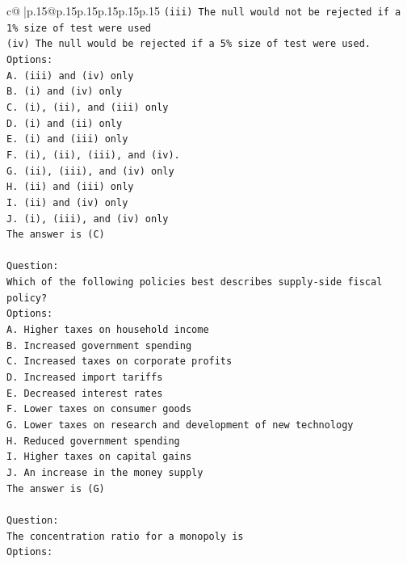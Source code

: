 \documentclass{article}
\begin{document}
{\begin{supertabular}{c@{$\;$}|p{.15\linewidth}@{}p{.15\linewidth}p{.15\linewidth}p{.15\linewidth}p{.15\linewidth}p{.15\linewidth}}
{{{\texttt{(iii) The null would not be rejected if a 1\% size of test were used} \\
\texttt{(iv) The null would be rejected if a 5\% size of test were used.} \\
\texttt{Options:} \\
\texttt{A. (iii) and (iv) only} \\
\texttt{B. (i) and (iv) only} \\
\texttt{C. (i), (ii), and (iii) only} \\
\texttt{D. (i) and (ii) only} \\
\texttt{E. (i) and (iii) only} \\
\texttt{F. (i), (ii), (iii), and (iv).} \\
\texttt{G. (ii), (iii), and (iv) only} \\
\texttt{H. (ii) and (iii) only} \\
\texttt{I. (ii) and (iv) only} \\
\texttt{J. (i), (iii), and (iv) only} \\
\texttt{The answer is (C)} \\
\\ 
\texttt{Question:} \\
\texttt{Which of the following policies best describes supply{-}side fiscal policy?} \\
\texttt{Options:} \\
\texttt{A. Higher taxes on household income} \\
\texttt{B. Increased government spending} \\
\texttt{C. Increased taxes on corporate profits} \\
\texttt{D. Increased import tariffs} \\
\texttt{E. Decreased interest rates} \\
\texttt{F. Lower taxes on consumer goods} \\
\texttt{G. Lower taxes on research and development of new technology} \\
\texttt{H. Reduced government spending} \\
\texttt{I. Higher taxes on capital gains} \\
\texttt{J. An increase in the money supply} \\
\texttt{The answer is (G)} \\
\\ 
\texttt{Question:} \\
\texttt{The concentration ratio for a monopoly is} \\
\texttt{Options:} \\
}}}
\end{supertabular}}
\end{document}
